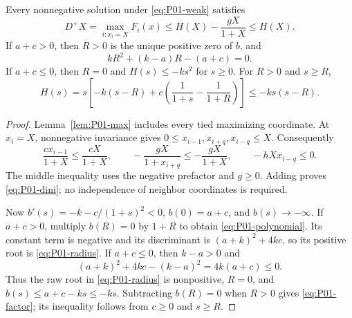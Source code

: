 \begin{lemma}
\label{lem:P01-bound}
Every nonnegative solution under \eqref{eq:P01-weak} satisfies
\begin{equation}
\label{eq:P01-dini}
 D^+X=\max_{i:x_i=X}F_i(x)
       \le H(X)-\frac{gX}{1+X}\le H(X).
\end{equation}
If $a+c>0$, then $R>0$ is the unique positive zero of $b$, and
\begin{equation}
\label{eq:P01-polynomial}
 kR^2+(k-a)R-(a+c)=0.
\end{equation}
If $a+c\le0$, then $R=0$ and $H(s)\le-ks^2$ for $s\ge0$.
For $R>0$ and $s\ge R$,
\begin{equation}
\label{eq:P01-factor}
 H(s)=s\left[-k(s-R)
    +c\left(\frac1{1+s}-\frac1{1+R}\right)\right]\le-ks(s-R).
\end{equation}
\end{lemma}
\begin{proof}
Lemma~\ref{lem:P01-max} includes every tied maximizing coordinate.
At $x_i=X$, nonnegative invariance gives
$0\le x_{i-1},x_{i+q},x_{i-q}\le X$. Consequently
\[
 \frac{c x_{i-1}}{1+X}\le\frac{cX}{1+X},\qquad
 -\frac{gX}{1+x_{i+q}}\le-\frac{gX}{1+X},\qquad
 -hXx_{i-q}\le0.
\]
The middle inequality uses the negative prefactor and $g\ge0$.
Adding proves \eqref{eq:P01-dini}; no independence of neighbor
coordinates is required.

Now $b'(s)=-k-c/(1+s)^2<0$, $b(0)=a+c$, and $b(s)\to-\infty$.
If $a+c>0$, multiply $b(R)=0$ by $1+R$ to obtain
\eqref{eq:P01-polynomial}. Its constant term is negative and its
discriminant is $(a+k)^2+4kc$, so its positive root is
\eqref{eq:P01-radius}. If $a+c\le0$, then $k-a>0$ and
\[
 (a+k)^2+4kc-(k-a)^2=4k(a+c)\le0.
\]
Thus the raw root in \eqref{eq:P01-radius} is nonpositive, $R=0$,
and $b(s)\le a+c-ks\le-ks$. Subtracting $b(R)=0$ when $R>0$
gives \eqref{eq:P01-factor}; its inequality follows from $c\ge0$
and $s\ge R$.
\end{proof}

